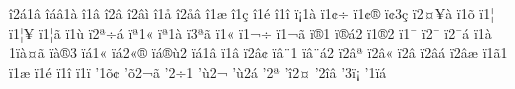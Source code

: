 {^^ee2^^e11^^e2
^^ee^^e1^^e21^^e0
^^ee1^^e2
^^ee2^^e2^^ad
^^ee2^^e2^^ec
^^ee1^^e5
^^ee2^^e5^^e2
^^ee1^^e6
^^ee1^^e7
^^ee1^^e9
^^ee1^^ee
^^ef^^a11^^e0
^^ef1^^a2^^f7
^^ef1^^a2^^ae
^^ef^^a23^^e7
^^ef2^^a4^^a5^^e0
^^ef1^^f5
^^ef1^^a6^^a0
^^ef1^^a6^^a5
^^ef1^^a6^^e3
^^ef1^^f9
^^ef2^^aa^^f7^^e1
^^ef^^aa1^^ab
^^ef^^aa1^^e0
^^ef3^^aa^^e3
^^ef1^^ab
^^ef1^^ac^^f7
^^ef1^^ac^^e3
^^ef^^ad^^ae1
^^ef^^ad^^ae^^e12
^^ef1^^ae2
^^ef1^^af
^^ef2^^af^^ad
^^ef2^^af^^e1
^^ef1^^e0^^a0
1^^ef^^e0^^a4^^e3
^^ef^^e0^^ae3
^^ef^^e11^^ab
^^ef^^e12^^ab^^ae
^^ef^^e1^^ae^^f92
^^ef^^e11^^e2
^^ef1^^e2
^^ef2^^e2^^a2
^^ef^^e2^^a81
^^ef^^e2^^a8^^e12
^^ef2^^e2^^aa
^^ef2^^e2^^ab
^^ef2^^e2^^ad
^^ef2^^e2^^e1
^^ef2^^e2^^e6
^^ef1^^e31
^^ef1^^e6
^^ef1^^e9
^^ef1^^ee
^^ef1^^ef
'1^^f5^^a2
'^^f52^^ac^^e3
'2^^f71
'^^f92^^ac
'^^f92^^e1
'2^^aa
'^^ee2^^a4
'2^^ee^^e2
'3^^ef^^a1
'1^^ef^^e1^^ad
}
